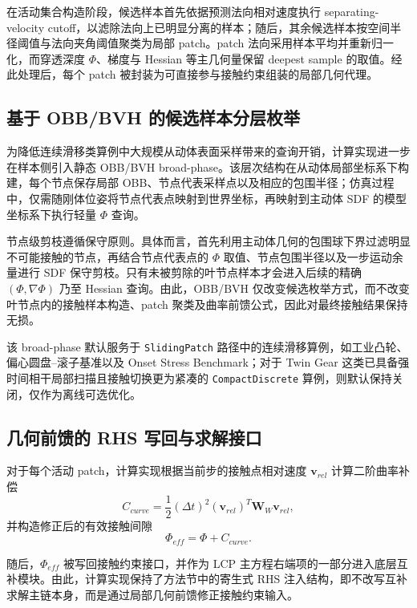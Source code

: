 在活动集合构造阶段，候选样本首先依据预测法向相对速度执行 separating-velocity cutoff，以滤除法向上已明显分离的样本；随后，其余候选样本按空间半径阈值与法向夹角阈值聚类为局部 patch。patch 法向采用样本平均并重新归一化，而穿透深度 $\Phi$、梯度与 Hessian 等主几何量保留 deepest sample 的取值。经此处理后，每个 patch 被封装为可直接参与接触约束组装的局部几何代理。

\subsection{基于 OBB/BVH 的候选样本分层枚举}

为降低连续滑移类算例中大规模从动体表面采样带来的查询开销，计算实现进一步在样本侧引入静态 OBB/BVH broad-phase。该层次结构在从动体局部坐标系下构建，每个节点保存局部 OBB、节点代表采样点以及相应的包围半径；仿真过程中，仅需随刚体位姿将节点代表点映射到世界坐标，再映射到主动体 SDF 的模型坐标系下执行轻量 $\Phi$ 查询。

节点级剪枝遵循保守原则。具体而言，首先利用主动体几何的包围球下界过滤明显不可能接触的节点，再结合节点代表点的 $\Phi$ 取值、节点包围半径以及一步运动余量进行 SDF 保守剪枝。只有未被剪除的叶节点样本才会进入后续的精确 $(\Phi,\nabla\Phi)$ 乃至 Hessian 查询。由此，OBB/BVH 仅改变候选枚举方式，而不改变叶节点内的接触样本构造、patch 聚类及曲率前馈公式，因此对最终接触结果保持无损。

该 broad-phase 默认服务于 \texttt{SlidingPatch} 路径中的连续滑移算例，如工业凸轮、偏心圆盘--滚子基准以及 Onset Stress Benchmark；对于 Twin Gear 这类已具备强时间相干局部扫描且接触切换更为紧凑的 \texttt{CompactDiscrete} 算例，则默认保持关闭，仅作为离线可选优化。

\subsection{几何前馈的 RHS 写回与求解接口}

对于每个活动 patch，计算实现根据当前步的接触点相对速度 $\mathbf{v}_{rel}$ 计算二阶曲率补偿
\begin{equation}
    C_{curve} = \frac{1}{2} (\Delta t)^2 (\mathbf{v}_{rel})^T \mathbf{W}_{W} \mathbf{v}_{rel},
\end{equation}
并构造修正后的有效接触间隙
\begin{equation}
    \Phi_{eff} = \Phi + C_{curve}.
\end{equation}

随后，$\Phi_{eff}$ 被写回接触约束接口，并作为 LCP 主方程右端项的一部分进入底层互补模块。由此，计算实现保持了方法节中的寄生式 RHS 注入结构，即不改写互补求解主链本身，而是通过局部几何前馈修正接触约束输入。

